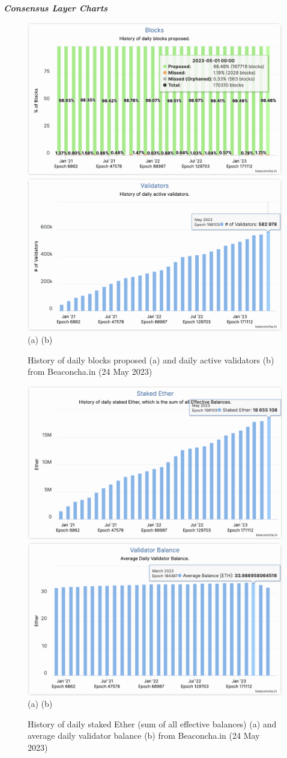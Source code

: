 \documentclass[UTF8]{article}
\begin{document}
{\clearpage
\textit{\textbf{Consensus Layer Charts}}
\begin{figure}[htbp]
\begin{center}
\includegraphics[width=0.48\linewidth]{images/bchart1}
\includegraphics[width=0.48\linewidth]{images/bchart2} \\
(a)\hspace{160pt}        (b)\\
\caption{History of daily blocks proposed (a) and daily active validators (b) from Beaconcha.in (24 May 2023)}
\label{fig:chart1}
\end{center}
\end{figure}

\begin{figure}[htbp]
\begin{center}
\includegraphics[width=0.48\linewidth]{images/bchart3}
\includegraphics[width=0.48\linewidth]{images/bchart4} \\
(a)\hspace{160pt}        (b)\\
\caption{History of daily staked Ether (sum of all effective balances) (a) and average daily validator balance (b) from Beaconcha.in (24 May 2023)}
\label{fig:chart3}
\end{center}
\end{figure}

}
\end{document}
